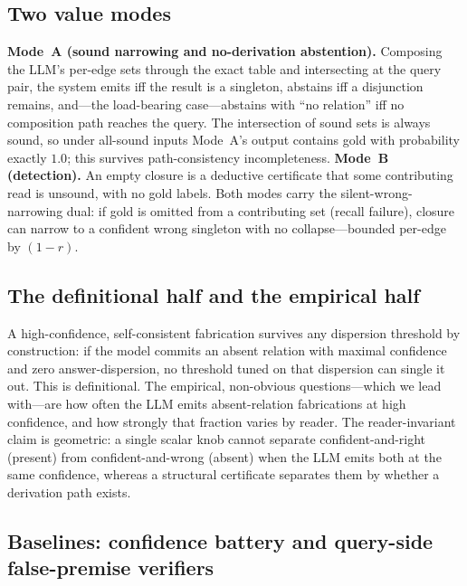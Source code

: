 \documentclass[11pt,letterpaper]{article}
\begin{document}
\subsection{Two value modes}

\textbf{Mode~A (sound narrowing and no-derivation abstention).} Composing the LLM's per-edge sets through the exact table and intersecting at the query pair, the system emits iff the result is a singleton, abstains iff a disjunction remains, and---the load-bearing case---abstains with ``no relation'' iff no composition path reaches the query. The intersection of sound sets is always sound, so under all-sound inputs Mode~A's output contains gold with probability exactly $1.0$; this survives path-consistency incompleteness. \textbf{Mode~B (detection).} An empty closure is a deductive certificate that some contributing read is unsound, with no gold labels. Both modes carry the silent-wrong-narrowing dual: if gold is omitted from a contributing set (recall failure), closure can narrow to a confident wrong singleton with no collapse---bounded per-edge by $(1-r)$.

\subsection{The definitional half and the empirical half}

A high-confidence, self-consistent fabrication survives any dispersion threshold by construction: if the model commits an absent relation with maximal confidence and zero answer-dispersion, no threshold tuned on that dispersion can single it out. This is definitional. The empirical, non-obvious questions---which we lead with---are how often the LLM emits absent-relation fabrications at high confidence, and how strongly that fraction varies by reader. The reader-invariant claim is geometric: a single scalar knob cannot separate confident-and-right (present) from confident-and-wrong (absent) when the LLM emits both at the same confidence, whereas a structural certificate separates them by whether a derivation path exists.

\subsection{Baselines: confidence battery and query-side false-premise verifiers}
\end{document}
